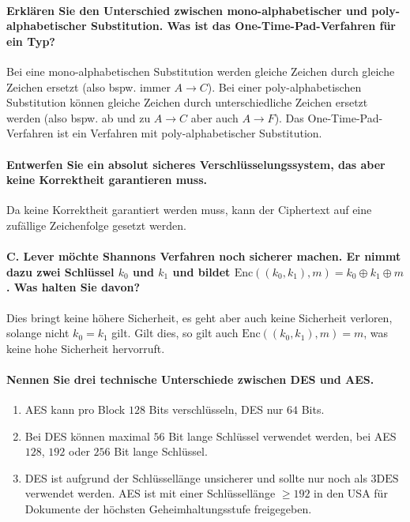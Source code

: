 \documentclass[a4paper, 11pt, accentcolor = tud3b]{tudreport}
\newcommand{\Enc}{\ensuremath{\textrm{Enc}}}
\begin{document}
	        \paragraph{Erklären Sie den Unterschied zwischen mono-alphabetischer und poly-alphabetischer Substitution. Was ist das One-Time-Pad-Verfahren für ein Typ?}
	        Bei eine mono-alphabetischen Substitution werden gleiche Zeichen durch gleiche Zeichen ersetzt (also bspw. immer \( A \rightarrow C \)). Bei einer poly-alphabetischen Substitution können gleiche Zeichen durch unterschiedliche Zeichen ersetzt werden (also bspw. ab und zu \( A \rightarrow C \) aber auch \( A \rightarrow F \)). Das One-Time-Pad-Verfahren ist ein Verfahren mit poly-alphabetischer Substitution.

	        \paragraph{Entwerfen Sie ein absolut sicheres Verschlüsselungssystem, das aber keine Korrektheit garantieren muss.}
	        Da keine Korrektheit garantiert werden muss, kann der Ciphertext auf eine zufällige Zeichenfolge gesetzt werden.

	        \paragraph{C. Lever möchte Shannons Verfahren noch sicherer machen. Er nimmt dazu zwei Schlüssel \(k_0\) und \(k_1\) und bildet \(\Enc((k_0, k_1), m) = k_0 \oplus k_1 \oplus m\). Was halten Sie davon?}
	        Dies bringt keine höhere Sicherheit, es geht aber auch keine Sicherheit verloren, solange nicht \( k_0 = k_1 \) gilt. Gilt dies, so gilt auch \( \Enc((k_0, k_1), m) = m \), was keine hohe Sicherheit hervorruft.

	        \paragraph{Nennen Sie drei technische Unterschiede zwischen DES und AES.}
	        \begin{enumerate}
	        	\item AES kann pro Block \(128\) Bits verschlüsseln, DES nur \(64\) Bits.
	        	\item Bei DES können maximal \(56\) Bit lange Schlüssel verwendet werden, bei AES \(128\), \(192\) oder \(256\) Bit lange Schlüssel.
	        	\item DES ist aufgrund der Schlüssellänge unsicherer und sollte nur noch als \(\textrm{3DES}\) verwendet werden. AES ist mit einer Schlüssellänge \( \geq 192 \) in den USA für Dokumente der höchsten Geheimhaltungsstufe freigegeben.
	        \end{enumerate}
	        
\end{document}
